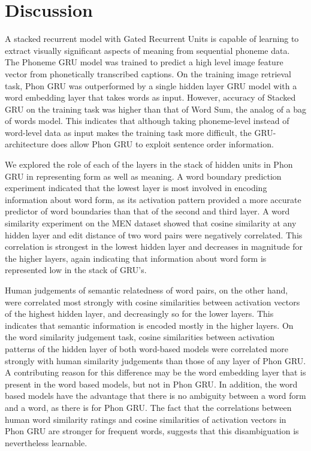 \section{Discussion}
\label{sec:discussion}
A stacked recurrent model with Gated Recurrent Units is capable of learning to extract visually significant aspects of meaning from sequential phoneme data. The {\sc Phoneme GRU} model was trained to predict a high level image feature vector from phonetically transcribed captions. On the training image retrieval task, {\sc Phon GRU} was outperformed by a single hidden layer GRU model with a word embedding layer that takes words as input. However, accuracy of {\sc Stacked GRU} on the training task was higher than that of {\sc Word Sum}, the analog of a bag of words model. This indicates that although taking phoneme-level instead of word-level data as input makes the training task more difficult, the GRU-architecture does allow {\sc Phon GRU} to exploit sentence order information.

We explored the role of each of the layers in the stack of hidden units in {\sc Phon GRU} in representing form as well as meaning. A word boundary prediction experiment indicated that the lowest layer is most involved in encoding information about word form, as its activation pattern provided a more accurate predictor of word boundaries than that of the second and third layer. A word similarity experiment on the MEN dataset showed that cosine similarity at any hidden layer and edit distance of two word pairs were negatively correlated. This correlation is strongest in the lowest hidden layer and decreases in magnitude for the higher layers, again indicating that information about word form is represented low in the stack of GRU's.

Human judgements of semantic relatedness of word pairs, on the other hand, were correlated most strongly with cosine similarities between activation vectors of the highest hidden layer, and decreasingly so for the lower layers. This indicates that semantic information is encoded mostly in the higher layers. On the word similarity judgement task, cosine similarities between activation patterns of the hidden layer of both word-based models were correlated more strongly with human similarity judgements than those of any layer of {\sc Phon GRU}. A contributing reason for this difference may be the word embedding layer that is present in the word based models, but not in {\sc Phon GRU}. In addition, the word based models have the advantage that there is no ambiguity between a word form and a word, as there is for {\sc Phon GRU}. The fact that the correlations between human word similarity ratings and cosine similarities of activation vectors in {\sc Phon GRU} are stronger for frequent words, suggests that this disambiguation is nevertheless learnable.

